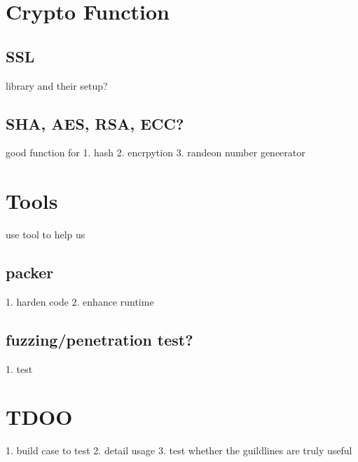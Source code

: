 \documentclass[12pt, a4paper]{article}
\begin{document}
\section{Crypto Function}
\subsection{SSL}
library and their setup?

\subsection{SHA, AES, RSA, ECC?}
good function for
1. hash
2. encrpytion
3. randeon number geneerator

\section{Tools}
use tool to help us
\subsection{packer}
1. harden code
2. enhance runtime
\subsection{fuzzing/penetration test?}
1. test

\section{TDOO}
1. build case to test
2. detail usage
3. test whether the guildlines are truly useful



\end{document}
